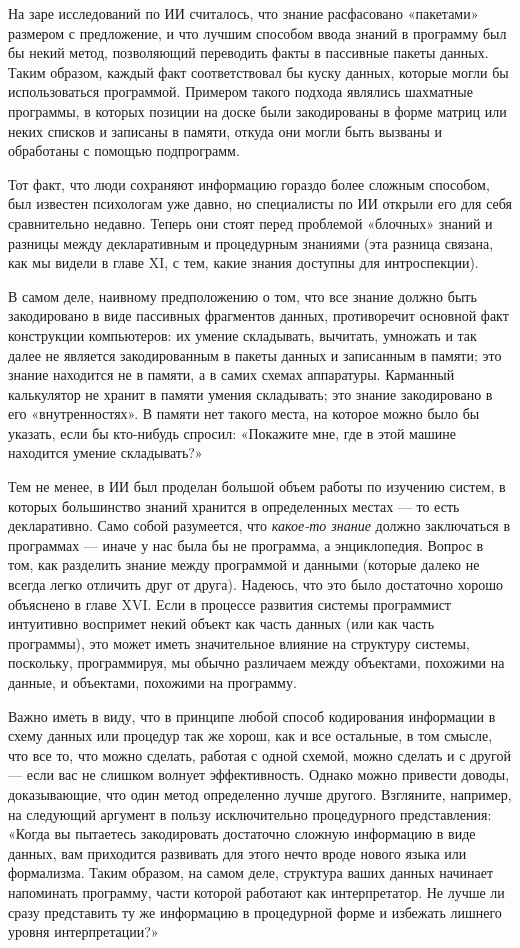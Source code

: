 \documentclass[../main.tex]{subfiles}
\begin{document}
На заре исследований по ИИ считалось, что знание расфасовано «пакетами» размером с предложение, и что лучшим способом ввода знаний в программу был бы некий метод, позволяющий переводить факты в пассивные пакеты данных. Таким образом, каждый факт соответствовал бы куску данных, которые могли бы использоваться программой. Примером такого подхода являлись шахматные программы, в которых позиции на доске были закодированы в форме матриц или неких списков и записаны в памяти, откуда они могли быть вызваны и обработаны с помощью подпрограмм.

Тот факт, что люди сохраняют информацию гораздо более сложным способом, был известен психологам уже давно, но специалисты по ИИ открыли его для себя сравнительно недавно. Теперь они стоят перед проблемой «блочных» знаний и разницы между декларативным и процедурным знаниями (эта разница связана, как мы видели в главе XI, с тем, какие знания доступны для интроспекции).

В самом деле, наивному предположению о том, что все знание должно быть закодировано в виде пассивных фрагментов данных, противоречит основной факт конструкции компьютеров: их умение складывать, вычитать, умножать и так далее не является закодированным в пакеты данных и записанным в памяти; это знание находится не в памяти, а в самих схемах аппаратуры. Карманный калькулятор не хранит в памяти умения складывать; это знание закодировано в его «внутренностях». В памяти нет такого места, на которое можно было бы указать, если бы кто-нибудь спросил: «Покажите мне, где в этой машине находится умение складывать?»

Тем не менее, в ИИ был проделан большой объем работы по изучению систем, в которых большинство знаний хранится в определенных местах --- то есть декларативно. Само собой разумеется, что \emph{какое-то знание} должно заключаться в программах --- иначе у нас была бы не программа, а энциклопедия. Вопрос в том, как разделить знание между программой и данными (которые далеко не всегда легко отличить друг от друга). Надеюсь, что это было достаточно хорошо объяснено в главе XVI. Если в процессе развития системы программист интуитивно воспримет некий объект как часть данных (или как часть программы), это может иметь значительное влияние на структуру системы, поскольку, программируя, мы обычно различаем между объектами, похожими на данные, и объектами, похожими на программу.

Важно иметь в виду, что в принципе любой способ кодирования информации в схему данных или процедур так же хорош, как и все остальные, в том смысле, что все то, что можно сделать, работая с одной схемой, можно сделать и с другой --- если вас не слишком волнует эффективность. Однако можно привести доводы, доказывающие, что один метод определенно лучше другого. Взгляните, например, на следующий аргумент в пользу исключительно процедурного представления: «Когда вы пытаетесь закодировать достаточно сложную информацию в виде данных, вам приходится развивать для этого нечто вроде нового языка или формализма. Таким образом, на самом деле, структура ваших данных начинает напоминать программу, части которой работают как интерпретатор. Не лучше ли сразу представить ту же информацию в процедурной форме и избежать лишнего уровня интерпретации?»
\end{document}
